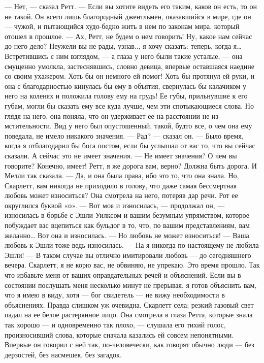 — Нет, — сказал Ретт. — Если вы хотите видеть его таким, каков он есть, то он не такой. Он всего лишь благородный джентльмен, оказавшийся в мире, где он — чужой, и пытающийся худо-бедно жить в нем по законам мира, который отошел в прошлое.
— Ах, Ретт, не будем о нем говорить! Ну, какое нам сейчас до него дело? Неужели вы не рады, узнав.., я хочу сказать: теперь, когда я…
Встретившись с ним взглядом, — а глаза у него были такие усталые, — она смущенно умолкла, застеснявшись, словно девица, впервые оставшаяся наедине со своим ухажером. Хоть бы он немного ей помог! Хоть бы протянул ей руки, и она с благодарностью кинулась бы ему в объятия, свернулась бы калачиком у него на коленях и положила голову ему на грудь! Ее губы, прильнувшие к его губам, могли бы сказать ему все куда лучше, чем эти спотыкающиеся слова. Но глядя на него, она поняла, что он удерживает ее на расстоянии не из мстительности. Вид у него был опустошенный, такой, будто все, о чем она ему поведала, не имело никакого значения.
— Рад? — сказал он. — Было время, когда я отблагодарил бы бога постом, если бы услышал от вас то, что вы сейчас сказали. А сейчас это не имеет значения.
— Не имеет значения? О чем вы говорите? Конечно, имеет! Ретт, я же дорога вам, верно? Должна быть дорога. И Мелли так сказала.
— Да, и она была права, ибо это то, что она знала. Но, Скарлетт, вам никогда не приходило в голову, что даже самая бессмертная любовь может износиться?
Она смотрела на него, потеряв дар речи. Рот ее округлился буквой «о».
— Вот моя и износилась, — продолжал он, — износилась в борьбе с Эшли Уилксом и вашим безумным упрямством, которое побуждает вас вцепиться как бульдог в то, что, по вашим представлениям, вам желанно… Вот она и износилась.
— Но любовь не может износиться!
— Ваша любовь к Эшли тоже ведь износилась.
— На я никогда по-настоящему не любила Эшли! — В таком случае вы отлично имитировали любовь — до сегодняшнего вечера. Скарлетт, я не корю вас, не обвиняю, не упрекаю. Это время прошло. Так что избавьте меня от ваших оправдательных речей и объяснений. Если вы в состоянии послушать меня несколько минут не прерывая, я готов объяснить вам, что я имею в виду, хотя — бог свидетель — не вижу необходимости в объяснениях. Правда слишком уж очевидна.
Скарлетт села; резкий газовый свет падал на ее белое растерянное лицо. Она смотрела в глаза Ретта, которые знала так хорошо — и одновременно так плохо, — слушала его тихий голос, произносивший слова, которые сначала казались ей совсем непонятными. Впервые он говорил с ней так, по-человечески, как говорят обычно люди — без дерзостей, без насмешек, без загадок.

